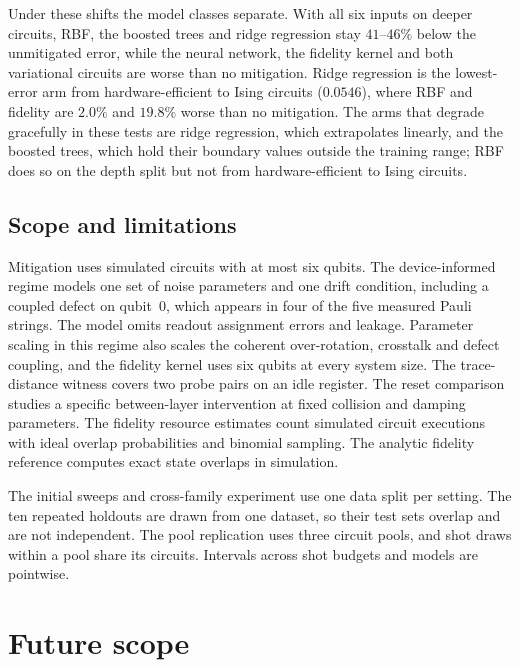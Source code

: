 \documentclass[Thesis.tex]{subfiles}
\begin{document}
Under these shifts the model classes separate. With all six inputs on deeper circuits,
RBF, the boosted trees and ridge regression stay $41$--$46\%$ below the unmitigated
error, while the neural network, the fidelity kernel and both variational circuits are
worse than no mitigation. Ridge regression is the lowest-error arm from
hardware-efficient to Ising circuits ($0.0546$), where RBF and fidelity are $2.0\%$ and
$19.8\%$ worse than no mitigation. The arms that degrade gracefully in these tests are
ridge regression, which extrapolates linearly, and the boosted trees, which hold their
boundary values outside the training range; RBF does so on the depth split but not
from hardware-efficient to Ising circuits.

\subsection{Scope and limitations}

Mitigation uses simulated circuits with at most six qubits. The device-informed
regime models one set of noise parameters and one drift condition, including a
coupled defect on qubit~$0$, which appears in four of the five measured Pauli
strings. The model omits readout assignment errors and leakage. Parameter scaling in this
regime also scales the coherent over-rotation, crosstalk and defect coupling, and the
fidelity kernel uses six qubits at every system size. The trace-distance witness covers two
probe pairs on an idle register. The reset comparison studies a specific
between-layer intervention at fixed collision and damping parameters.
The fidelity resource estimates count simulated circuit executions with ideal
overlap probabilities and binomial sampling. The analytic fidelity reference
computes exact state overlaps in simulation.

The initial sweeps and cross-family experiment use one data split per setting.
The ten repeated holdouts are drawn from one dataset, so their test sets overlap and are not independent. The pool replication uses three circuit
pools, and shot draws within a pool share its circuits. Intervals across shot
budgets and models are pointwise.

\section{Future scope}
\end{document}
